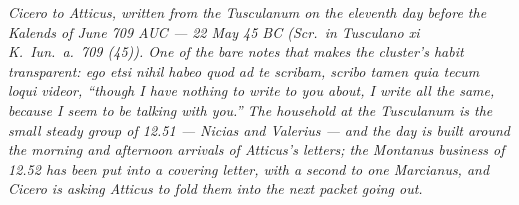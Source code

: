 
\textit{Cicero to Atticus, written from the Tusculanum
on the eleventh day before the Kalends of June 709
AUC --- 22 May 45 BC (\textit{Scr.\ in Tusculano xi
K.\ Iun.\ a.\ 709 (45)}). One of the bare notes that
makes the cluster's habit transparent: \textit{ego
etsi nihil habeo quod ad te scribam, scribo tamen
quia tecum loqui videor}, ``though I have nothing to
write to you about, I write all the same, because I
seem to be talking with you.'' The household at the
Tusculanum is the small steady group of 12.51 ---
Nicias and Valerius --- and the day is built around
the morning and afternoon arrivals of Atticus's
letters; the Montanus business of 12.52 has been put
into a covering letter, with a second to one
Marcianus, and Cicero is asking Atticus to fold them
into the next packet going out.}
